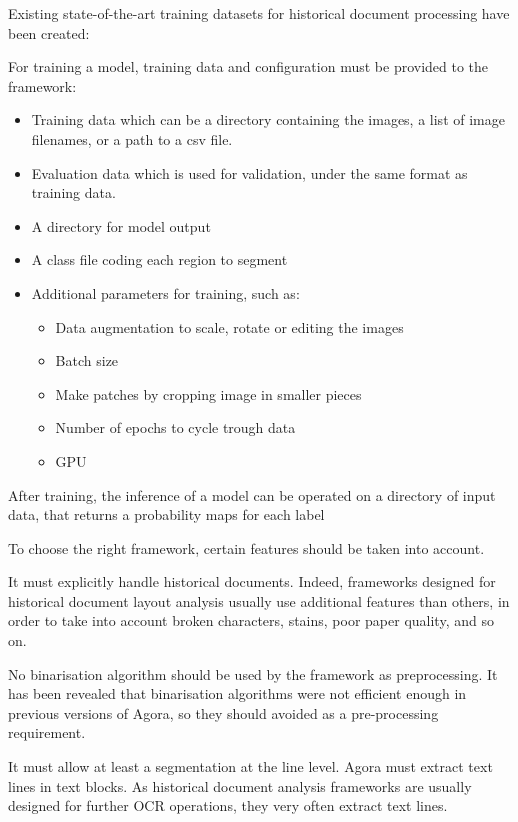 \documentclass{polytech/polytech}
\numberwithin{figure}{chapter}
\begin{document}
Existing state-of-the-art training datasets for historical document processing have been created:

\label{datasets}

For training a model, training data and configuration must be provided to the framework:
\begin{itemize}
\item Training data which can be a directory containing the images, a list of image filenames, or a path to a csv file.
\item Evaluation data which is used for validation, under the same format as training data.
\item A directory for model output
\item A class file coding each region to segment
\item Additional parameters for training, such as:
	\begin{itemize}
	\item Data augmentation to scale, rotate or editing the images
	\item Batch size
	\item Make patches by cropping image in smaller pieces
	\item Number of epochs to cycle trough data
	\item GPU
	\end{itemize}
\end{itemize}

After training, the inference of a model can be operated on a directory of input data, that returns a probability maps for each label


To choose the right framework, certain features should be taken into account.

It must explicitly handle historical documents.
Indeed, frameworks designed for historical document layout analysis usually use additional features than others, in order to take into account broken characters, stains, poor paper quality, and so on.

No binarisation algorithm should be used by the framework as preprocessing.
It has been revealed that binarisation algorithms were not efficient enough in previous versions of Agora, so they should avoided as a pre-processing requirement.

It must allow at least a segmentation at the line level.
Agora must extract text lines in text blocks.
As historical document analysis frameworks are usually designed for further OCR operations, they very often extract text lines.
\end{document}
